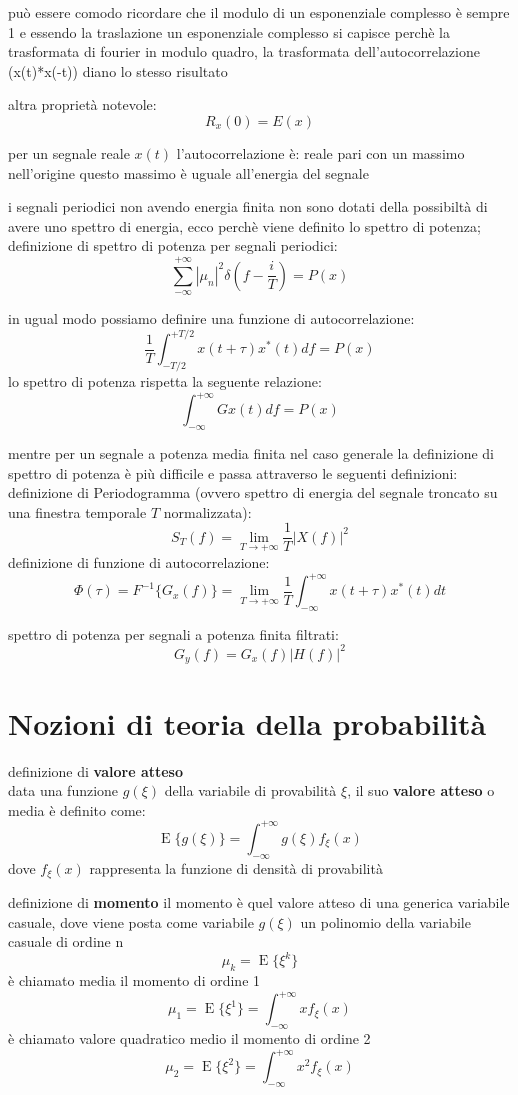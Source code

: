 \documentclass{article}
\begin{document}
può essere comodo ricordare che il modulo di un esponenziale complesso è sempre 1
e essendo la traslazione un esponenziale complesso si capisce perchè la trasformata di fourier
in modulo quadro, la trasformata dell'autocorrelazione (x(t)*x(-t)) diano lo stesso risultato

altra proprietà notevole:
$$R_x(0) = E(x)$$

per un segnale reale $x(t)$ l'autocorrelazione è:
reale
pari
con un massimo nell'origine
questo massimo è uguale all'energia del segnale

i segnali periodici non avendo energia finita non sono dotati
della possibiltà di avere uno spettro di energia, ecco perchè viene
definito lo spettro di potenza;
definizione di spettro di potenza per segnali periodici:
$$\sum_{-\infty}^{+\infty}|\mu_n|^2 \delta(f-\frac{i}{T}) = P(x)$$

in ugual modo possiamo definire una funzione di autocorrelazione:
$$\frac{1}{T}\int_{-T/2}^{+T/2} x(t+\tau)x^*(t)df = P(x)$$
lo spettro di potenza rispetta la seguente relazione:
$$\int_{-\infty}^{+\infty} Gx(t)df = P(x)$$

mentre per un segnale a potenza media finita nel caso generale la definizione di spettro
di potenza è più difficile e passa attraverso le seguenti definizioni:
definizione di Periodogramma (ovvero spettro di energia del segnale troncato su una
finestra temporale $T$ normalizzata):
$$S_T(f)=\lim_{T \to +\infty}\frac{1}{T}|X(f)|^2$$
definizione di funzione di autocorrelazione:
$$\Phi(\tau) = F^{-1}\{G_x(f)\} =\lim_{T \to +\infty} \frac{1}{T} \int_{-\infty}^{+\infty}x(t+\tau)x^*(t)dt$$

spettro di potenza per segnali a potenza finita filtrati:
$$G_y(f) = G_x(f)|H(f)|^2$$


\section{Nozioni di teoria della probabilità}
definizione di \textbf{valore atteso}
\\
data una funzione $g(\xi)$ della variabile di provabilità $\xi$, il suo \textbf{valore atteso} o media è
definito come:
$$\operatorname{E}\{g(\xi)\} = \int_{-\infty}^{+\infty} g(\xi)f_\xi (x)$$
dove $f_\xi (x)$ rappresenta la funzione di densità di provabilità

definizione di \textbf{momento}
il momento è quel valore atteso di una generica variabile casuale, dove viene
posta come variabile $g(\xi)$ un polinomio della variabile casuale di
ordine n
$$\mu_k = \operatorname{E}\{\xi^k\}$$
è chiamato media il momento di ordine 1
$$\mu_1 = \operatorname{E}\{\xi^1\} = \int_{-\infty}^{+\infty} xf_\xi (x)$$
è chiamato valore quadratico medio il momento di ordine 2
$$\mu_2 = \operatorname{E}\{\xi^2\} = \int_{-\infty}^{+\infty} x^2f_\xi (x)$$
\end{document}
